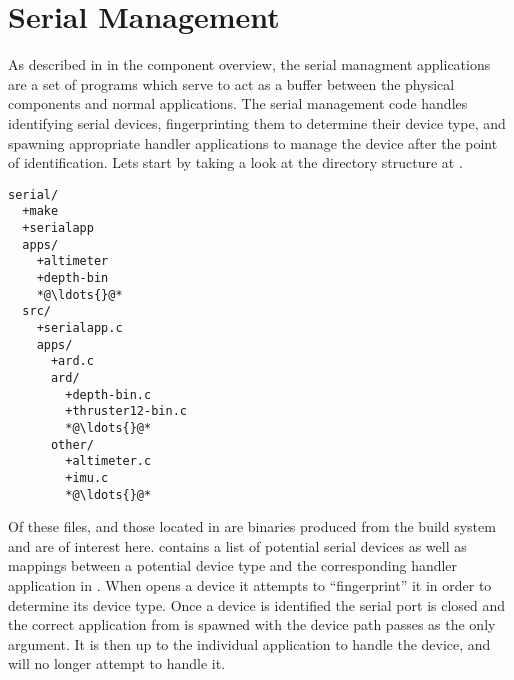 
\newpage
\section{Serial Management} \label{serial}
As described in  in the component
overview, the serial managment applications are a set of programs which serve to
act as a buffer between the physical components and normal applications. The
serial management code handles identifying serial devices, fingerprinting them
to determine their device type, and spawning appropriate handler applications to
manage the device after the point of identification. Lets start by taking a look
at the directory structure at .

\begin{lstlisting}[language=FileList, caption=Serial directory structure, escapeinside={{*@}{@*}}]
serial/
  +make
  +serialapp
  apps/
    +altimeter
    +depth-bin
    *@\ldots{}@*
  src/
    +serialapp.c
    apps/
      +ard.c
      ard/
        +depth-bin.c
        +thruster12-bin.c
        *@\ldots{}@*
      other/
        +altimeter.c
        +imu.c
        *@\ldots{}@*
\end{lstlisting}

Of these files,  and those located in  are binaries
produced from the build system and are of interest here. 
contains a list of potential serial devices as well as mappings between a
potential device type and the corresponding handler application in
. When  opens a device it attempts to
``fingerprint'' it in order to determine its device type. Once a device is
identified the serial port is closed and the correct application from
 is spawned with the device path passes as the only argument. It is
then up to the individual application to handle the device, and 
will no longer attempt to handle it. 
